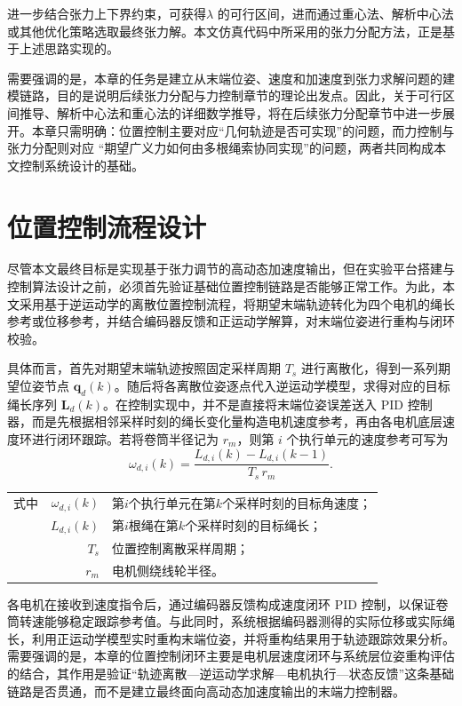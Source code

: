 进一步结合张力上下界约束，可获得$\lambda$ 的可行区间，进而通过重心法、解析中心法或其他优化策略选取最终张力解。本文仿真代码中所采用的张力分配方法，正是基于上述思路实现的。

需要强调的是，本章的任务是建立从末端位姿、速度和加速度到张力求解问题的建模链路，目的是说明后续张力分配与力控制章节的理论出发点。因此，关于可行区间推导、解析中心法和重心法的详细数学推导，将在后续张力分配章节中进一步展开。本章只需明确：位置控制主要对应“几何轨迹是否可实现”的问题，而力控制与张力分配则对应 “期望广义力如何由多根绳索协同实现”的问题，两者共同构成本文控制系统设计的基础。

\section{位置控制流程设计}

尽管本文最终目标是实现基于张力调节的高动态加速度输出，但在实验平台搭建与控制算法设计之前，必须首先验证基础位置控制链路是否能够正常工作。为此，本文采用基于逆运动学的离散位置控制流程，将期望末端轨迹转化为四个电机的绳长参考或位移参考，并结合编码器反馈和正运动学解算，对末端位姿进行重构与闭环校验。

具体而言，首先对期望末端轨迹按照固定采样周期 $T_s$ 进行离散化，得到一系列期望位姿节点 $\bm q_d(k)$。随后将各离散位姿逐点代入逆运动学模型，求得对应的目标绳长序列 $\bm L_d(k)$。在控制实现中，并不是直接将末端位姿误差送入 PID 控制器，而是先根据相邻采样时刻的绳长变化量构造电机速度参考，再由各电机底层速度环进行闭环跟踪。若将卷筒半径记为 $r_m$，则第 $i$ 个执行单元的速度参考可写为
\begin{equation}
  \omega_{d,i}(k)=\frac{L_{d,i}(k)-L_{d,i}(k-1)}{T_s\,r_m}. \label{eq:ch3-speed-command}
\end{equation}
\begin{tabularx}{\textwidth}{@{}l@{\quad}r@{———}X@{}}
  式中 & $\omega_{d,i}(k)$ & 第$i$个执行单元在第$k$个采样时刻的目标角速度；\\
       & $L_{d,i}(k)$ & 第$i$根绳在第$k$个采样时刻的目标绳长；\\
       & $T_s$ & 位置控制离散采样周期；\\
       & $r_m$ & 电机侧绕线轮半径。
\end{tabularx}
各电机在接收到速度指令后，通过编码器反馈构成速度闭环 PID 控制，以保证卷筒转速能够稳定跟踪参考值。与此同时，系统根据编码器测得的实际位移或实际绳长，利用正运动学模型实时重构末端位姿，并将重构结果用于轨迹跟踪效果分析。需要强调的是，本章的位置控制闭环主要是电机层速度闭环与系统层位姿重构评估的结合，其作用是验证“轨迹离散—逆运动学求解—电机执行—状态反馈”这条基础链路是否贯通，而不是建立最终面向高动态加速度输出的末端力控制器。

